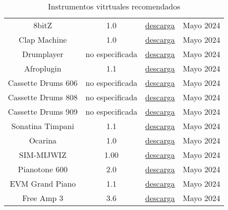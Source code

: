 \begin{table}[h]
\begin{tabular}{c|c|c|c}
            8bitZ & 1.0 & \href{https://plugins4free.com/plugin/1880/descarga}{descarga} & Mayo 2024\\
            
            Clap Machine & 1.0 & \href{https://plugins4free.com/plugin/2165/}{descarga} & Mayo 2024\\
            
            Drumplayer & no especificada & \href{https://99sounds.org/free-drum-vst/}{descarga} & Mayo 2024\\
            
            Afroplugin & 1.1 & \href{https://plugins4free.com/plugin/3259/}{descarga} & Mayo 2024\\
            
            Cassette Drums 606 & no especificada & \href{https://bedroomproducersblog.com/2016/11/23/drum-machine-vst/}{descarga} & Mayo 2024\\
            
            Cassette Drums 808 & no especificada & \href{https://bedroomproducersblog.com/2016/11/23/drum-machine-vst/}{descarga} & Mayo 2024\\
            
            Cassette Drums 909 & no especificada & \href{https://bedroomproducersblog.com/2016/11/23/drum-machine-vst/}{descarga} & Mayo 2024\\
            
            Sonatina Timpani & 1.1 & \href{https://plugins4free.com/plugin/2331/}{descarga} & Mayo 2024\\
            
            Ocarina & 1.0 & \href{https://plugins4free.com/plugin/1832/}{descarga} & Mayo 2024\\
            
            SIM-MIJWIZ & 1.00 & \href{https://plugins4free.com/plugin/3790/}{descarga} & Mayo 2024\\
            
            Pianotone 600 & 2.0 & \href{https://www.samplescience.info/2020/12/pianotone-600.html}{descarga} & Mayo 2024\\
            
            EVM Grand Piano & 1.1 & \href{https://plugins4free.com/plugin/2194/}{descarga} & Mayo 2024\\
            
            Free Amp 3 & 3.6 & \href{https://plugins4free.com/plugin/580/}{descarga} & Mayo 2024\\
            
		\hline
	\end{tabular}
	\caption{Instrumentos vitrtuales recomendados}
	\label{tab:instrumentos-virtuales-recomendados-2}
\end{table}
